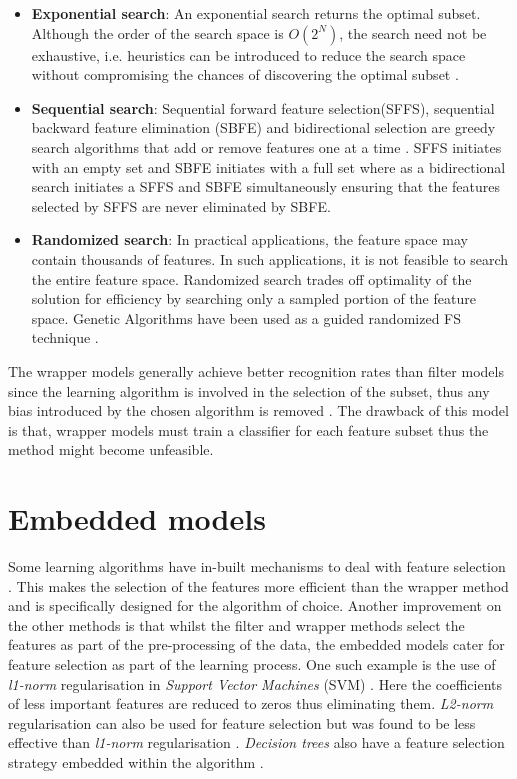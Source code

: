 \begin{itemize}
  \item\textbf{Exponential search}: An exponential search returns the optimal subset. Although the order of the search space is $O(2^N)$, the search need not be exhaustive, i.e. heuristics can be introduced to reduce the search space without compromising the chances of discovering the optimal subset \citep{liu2005toward}.
  \item\textbf{Sequential search}: Sequential forward feature selection(SFFS), sequential backward feature elimination (SBFE) and bidirectional selection are greedy search algorithms that add or remove features one at a time \citep{liu2005toward}. SFFS initiates with an empty set and SBFE initiates with a full set where as a bidirectional search initiates a SFFS and SBFE simultaneously ensuring that the features selected by SFFS are never eliminated by SBFE.
  \item\textbf{Randomized search}: In practical applications, the feature space may contain thousands of features. In such applications, it is not feasible to search the entire feature space. Randomized search trades off optimality of the solution for efficiency by searching only a sampled portion of the feature space. Genetic Algorithms have been used as a guided randomized FS technique \citep{cherkauer1996growing, vafaie1995genetic}.
\end{itemize}

The wrapper models generally achieve better recognition rates than filter models since the learning algorithm is involved in the selection of the subset, thus any bias introduced by the chosen algorithm is removed \cite{sammut2017encyclopedia}. The drawback of this model is that, wrapper models must train a classifier for each feature subset thus the method might become unfeasible.

\section{Embedded models}\label{sec:fs_filter}
Some learning algorithms have in-built mechanisms to deal with feature selection \citep{guyon2003introduction,sammut2017encyclopedia}. This makes the selection of the features more efficient than the wrapper method and is specifically designed for the algorithm of choice. Another improvement on the other methods is that whilst the filter and wrapper methods select the features as part of the pre-processing of the data, the embedded models cater for feature selection as part of the learning process. One such example is the use of \textit{l1-norm} regularisation in \textit{Support Vector Machines} (SVM) \citep{guyon2003introduction,de2015feature}. Here the coefficients of less important features are reduced to zeros thus eliminating them. \textit{L2-norm} regularisation can also be used for feature selection but was found to be less effective than \textit{l1-norm} regularisation \citep{de2015feature}. \textit{Decision trees} also have a feature selection strategy embedded within the algorithm \citep{garcia2015data}.

